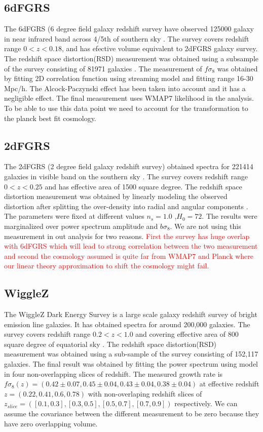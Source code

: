 \subsection{6dFGRS}
The 6dFGRS (6 degree field galaxy redshift survey have observed 125000 galaxy in near infrared band across 4/5th of southern sky \cite{Jones2009}. The survey covers redshift range $0<z<0.18$, and has efective volume equivalent to 2dFGRS \citep{2dFGRS} galaxy survey. The redshift space distortion(RSD) measurement was obtained using a subsample of the survey consisting of 81971 galaxies \citep{6dFGRS}. The measurement of $f\sigma_8$ was obtained by fitting 2D correlation function using streaming model and fitting range 16-30 Mpc/h. The Alcock-Paczynski effect has been taken into account and it has a negligible effect. The final measurement uses WMAP7 \citep{Wmap2013} likelihood in the analysis. To be able to use this data point we need to account for the transformation to the planck best fit cosmology. 

\subsection{2dFGRS}
The 2dFGRS (2 degree field galaxy redshift survey) obtained spectra for 221414 galaxies in visible band on the southern sky \citep{Colless2003}. The survey covers redshift range $0<z<0.25$ and has effective area of 1500 square degree. The redshift space distortion measurement was obtained by linearly modeling the observed distortion after splitting the over-density into radial and angular components \citep{2dFGRS}. The parameters were fixed at different values $n_s=1.0$ ,$H_0=72$. The results were marginalized over power spectrum amplitude and $b\sigma_8$.  We are not using this measurement in out analysis for two reasons. \textcolor{red}{First the survey has huge overlap with 6dFGRS which will lead to strong correlation between the two measurement and second the cosmology assumed is quite far from WMAP7 and Planck where our linear theory approximation to shift the cosmology might fail.}


\subsection{WiggleZ}
The WiggleZ Dark Energy Survey is a large scale galaxy redshift survey of bright emission line galaxies. It has obtained spectra for around 200,000 galaxies. The survey covers redshift range $0.2 <z <1.0$ and covering effective area of 800 square degree of equatorial sky \citep{WiggleZ}. The redshift space distortion(RSD) measurement was obtained using a sub-sample of the survey consisting of 152,117 galaxies. The final result was obtained by fitting the power spectrum using \citet{Jennings2011} model in four non-overlapping slices of redshift. The measured growth rate is $f\sigma_8(z)=( 0.42 \pm 0.07, 0.45 \pm 0.04, 0.43 \pm 0.04, 0.38 \pm 0.04)$ at effective redshift $z=(0.22, 0.41, 0.6, 0.78)$ with non-overlaping redshift slices of $z_{slice}=([0.1,0.3],[0.3,0.5],[0.5,0.7],[0.7,0.9])$ respectively. We can assume the covariance between the different measurement to be zero because they have zero overlapping volume.


